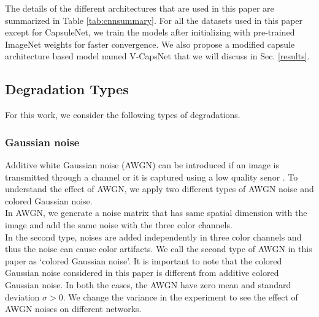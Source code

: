 \documentclass[10pt, journal, compsoc]{IEEEtran}
\begin{document}
The details of the different architectures that are used in this paper are summarized in Table \ref{tab:cnnsummary}. For all the datasets used in this paper except for CapsuleNet, we train the models after initializing with pre-trained ImageNet weights for faster convergence. We also propose a modified capsule architecture based model named V-CapsNet that we will discuss in Sec. \ref{results}.

\subsection{Degradation Types}
For this work, we consider the following types of degradations.
\subsubsection{Gaussian noise}
Additive white Gaussian noise (AWGN) can be introduced if an image is transmitted through a channel or it is captured using a low quality senor \cite{dodge2016understanding}. To understand the effect of AWGN, we apply two different types of AWGN noise and colored Gaussian noise.\\
In AWGN, we generate a noise matrix that has same spatial dimension with the image and add the same noise with the three color channels.\\
In the second type, noises are added independently in three color channels and thus the noise can cause color artifacts. We call the second type of AWGN in this paper as `colored Gaussian noise'. It is important to note that the colored Gaussian noise considered in this paper is different from additive colored Gaussian noise. In both the cases, the AWGN have zero mean and standard deviation $\sigma > 0$. We change the variance in the experiment to see the effect of AWGN noises on different networks.
\end{document}
